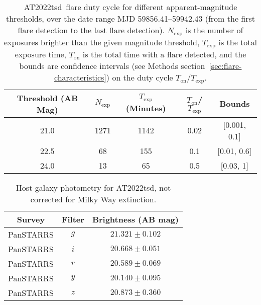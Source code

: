 \documentclass{nature_plusfigure}
\newcommand{\at}{AT2022tsd}
\begin{document}
\begin{extended_data}
\begin{table}
\begin{center}
\caption{\at\ flare duty cycle for different apparent-magnitude thresholds, over the date range MJD 59856.41--59942.43 (from the first flare detection to the last flare detection). $N_\mathrm{exp}$ is the number of exposures brighter than the given magnitude threshold, $T_\mathrm{exp}$ is the total exposure time, $T_\mathrm{on}$ is the total time with a flare detected, and the bounds are confidence intervals (see Methods section~\ref{sec:flare-characteristics}) on the duty cycle $T_\mathrm{on}/T_\mathrm{exp}$. }
\label{tab:flare-stats}
\begin{tabular}{ccccc} 
\hline\hline
Threshold (AB Mag) & $N_\mathrm{exp}$ & $T_\mathrm{exp}$ (Minutes) & $T_\mathrm{on}$/$T_\mathrm{exp}$ & Bounds \\
\hline
21.0 & 1271 & 1142 & 0.02 & [0.001, 0.1] \\
22.5 & 68 & 155 & 0.1 & [0.01, 0.6]  \\
24.0 & 13 & 65 & 0.5 & [0.03, 1] \\
\hline
\end{tabular}
\end{center}
\end{table}

\begin{table}
\begin{center}
\caption{Host-galaxy photometry for \at, not corrected for Milky Way extinction.}
\label{tab:host-photometry}
\begin{tabular}{ccc} 
\hline\hline
Survey & Filter & Brightness (AB mag) \\
\hline
PanSTARRS & $g$               &$ 21.321 \pm 0.102 $\\
PanSTARRS & $i$               &$ 20.668 \pm 0.051 $\\
PanSTARRS & $r$               &$ 20.589 \pm 0.069 $\\
PanSTARRS & $y$               &$ 20.140 \pm 0.095 $\\
PanSTARRS& $z$               &$ 20.873 \pm 0.360 $\\
\hline
\end{tabular}
\end{center}
\end{table}


\end{extended_data}

\clearpage
\end{document}
